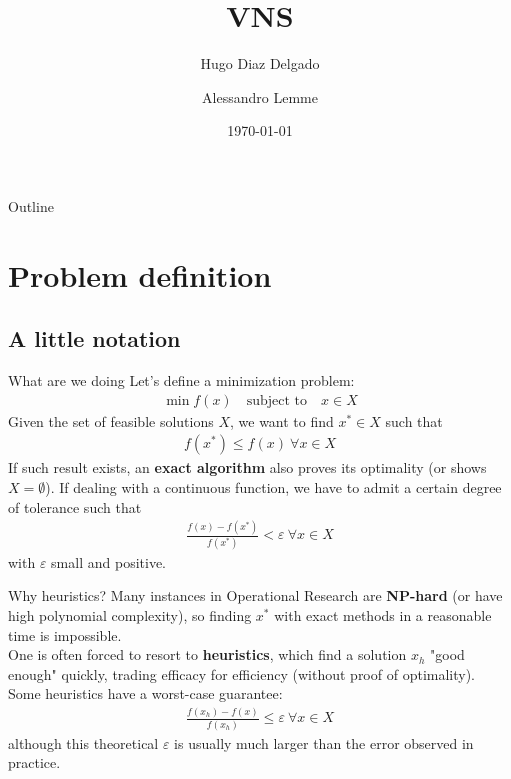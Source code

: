 \documentclass{beamer}
\title{VNS}
\author{Hugo Diaz Delgado \and Alessandro Lemme}
\institute{Università degli studi di Brescia}
\date{\today}
\begin{document}
\begin{frame}
\titlepage
\end{frame}

\begin{frame}{Outline}
\tableofcontents
\end{frame}

\section{Problem definition}

\subsection{A little notation}
\begin{frame}{What are we doing}
\quad Let's define a minimization problem:
\begin{gather*}
    \min f(x) \quad \text{subject to} \quad x \in X
\end{gather*}
\quad Given the set of feasible solutions $X$, we want to find $x^{*} \in X$ such that 
\begin{gather*}
    f(x^{*}) \leq f(x) \ \forall x \in X
\end{gather*} 
\quad If such result exists, an \textbf{exact algorithm} also proves its optimality (or shows $X = \emptyset$). If dealing with a continuous function, we have to admit a certain degree of tolerance such that
\begin{gather*}
    \frac{f(x) - f(x^{*})}{f(x^{*})} < \varepsilon \ \forall x \in X
\end{gather*} 
with $\varepsilon$ small and positive.
\end{frame}

\begin{frame}{Why heuristics?}
\quad Many instances in Operational Research are \textbf{NP-hard} (or have high polynomial complexity), so finding $x^{*}$ with exact methods in a reasonable time is impossible. \\
\vspace{0.2cm}
\quad One is often forced to resort to \textbf{heuristics}, which find a solution $x_h$ "good enough" quickly, trading efficacy for efficiency (without proof of optimality). \\
\vspace{0.2cm}
\quad Some heuristics have a worst-case guarantee:
\begin{gather*}
    \frac{f(x_{h}) - f(x)}{f(x_{h})} \leq \varepsilon \ \forall x \in X
\end{gather*}
although this theoretical $\varepsilon$ is usually much larger than the error observed in practice.
\end{frame}
\end{document}
